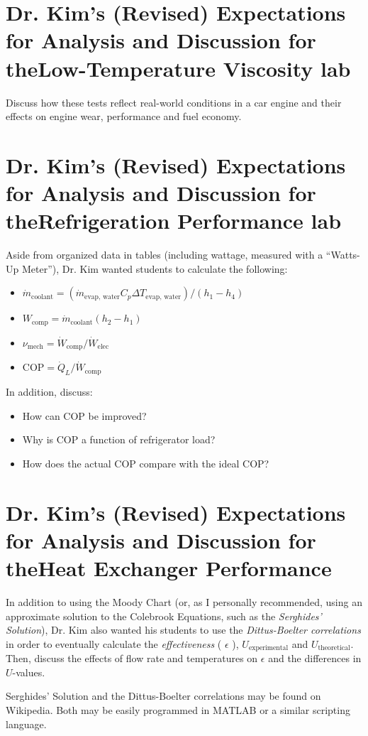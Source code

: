 \documentclass{article}
\newcommand{\kimspect}{Dr. Kim's (Revised) Expectations for Analysis and Discussion for the}
\begin{document}
\section{\kimspect Low-Temperature Viscosity lab}

Discuss how these tests reflect real-world conditions in a car engine and their
effects on engine wear, performance and fuel economy.

\pagebreak

\section{\kimspect Refrigeration Performance lab}

Aside from organized data in tables (including wattage, measured with a ``Watts-Up Meter''), Dr. Kim wanted students to calculate the
following:

\begin{itemize}
\item \(\dot{m}_{\textrm{coolant}} = (\dot{m}_{\textrm{evap, water}} C_p \Delta T_{\textrm{evap, water}})/(h_1 - h_4)\)
\item \(W_{\textrm{comp}} = \dot{m}_{\textrm{coolant}}(h_2 - h_1) \)
\item \(\nu_{\textrm{mech}} = \dot{W}_{\textrm{comp}} / \dot{W}_{\textrm{elec}} \)
\item \(\textrm{COP} = \dot{Q}_L / \dot{W}_{\textrm{comp}} \)
\end{itemize}

In addition, discuss:

\begin{itemize}
\item How can COP be improved?
\item Why is COP a function of refrigerator load?
\item How does the actual COP compare with the ideal COP?
\end{itemize}

\pagebreak

\section{\kimspect Heat Exchanger Performance}

In addition to using the Moody Chart (or, as I personally recommended, using an approximate solution to the Colebrook Equations, such as the \emph{Serghides' Solution}), Dr. Kim also wanted his students to use the \emph{Dittus-Boelter correlations} in order to eventually calculate the \emph{effectiveness} ( \(\epsilon\) ), \(U_{\textrm{experimental}}\) and \(U_{\textrm{theoretical}}\). Then, discuss the effects of flow rate and temperatures on \(\epsilon\) and the differences in \(U\)-values.

Serghides' Solution and the Dittus-Boelter correlations may be found on Wikipedia. Both may be easily programmed in MATLAB or a similar scripting language.

\pagebreak
\end{document}
